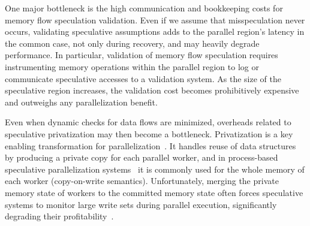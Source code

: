 
One major bottleneck is the high communication and bookkeeping costs
for memory flow speculation validation.  Even if we assume that
misspeculation never occurs, validating speculative assumptions adds
to the parallel region's latency in the common case, not only during
recovery, and may heavily degrade performance.
%
In particular, validation of memory flow speculation requires
instrumenting memory operations within the parallel region to log or
communicate speculative accesses to a validation system. As the size
of the speculative region increases, the validation cost becomes
prohibitively expensive and outweighs any parallelization benefit.
%


Even when dynamic checks for data flows are minimized, overheads
related to
speculative privatization
may then become a bottleneck.
%
Privatization is a key enabling transformation for
parallelization~\cite{citations_from_privateer}.
%
It handles reuse of data structures by producing a private copy for
each parallel worker,
%
%
and in process-based speculative parallelization
systems~\cite{kim:12:cgo,johnson:12:pldi,smtx,dstx} it is commonly
used for the whole memory of each worker (copy-on-write semantics).
%
%
Unfortunately, merging the private memory state of workers to the
committed memory state often forces speculative systems to monitor
large write sets during parallel execution, significantly degrading
their profitability~\cite{kim:12:cgo,johnson:12:pldi}.
%

